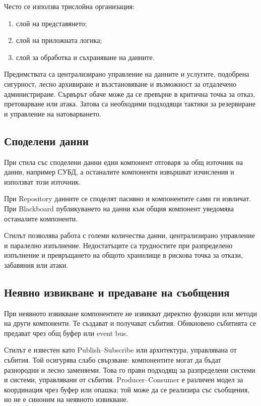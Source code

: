 Често се използва трислойна организация:

\begin{enumerate}
    \item слой на представянето;
    \item слой на приложната логика;
    \item слой за обработка и съхраняване на данните.
\end{enumerate}

Предимствата са централизирано управление на данните и услугите, подобрена сигурност, лесно архивиране и възстановяване и възможност за отдалечено администриране. Сървърът обаче може да се превърне в критична точка за отказ, претоварване или атака. Затова са необходими подходящи тактики за резервиране и управление на натоварването.

\subsection{Споделени данни}\label{s:27.4.5}

\begin{defn}
При стила със споделени данни един компонент отговаря за общ източник на данни, например СУБД, а останалите компоненти извършват изчисления и използват този източник.
\end{defn}

При Repository данните се споделят пасивно и компонентите сами ги извличат. При Blackboard публикуването на данни към общия компонент уведомява останалите компоненти.

Стилът позволява работа с големи количества данни, централизирано управление и паралелно изпълнение. Недостатъците са трудностите при разпределено изпълнение и превръщането на общото хранилище в рискова точка за откази, забавяния или атаки.

\subsection{Неявно извикване и предаване на съобщения}\label{s:27.4.6}

\begin{defn}
При неявното извикване компонентите не извикват директно функции или методи на други компоненти. Те създават и получават събития. Обикновено събитията се предават чрез общ буфер или event bus.
\end{defn}

Стилът е известен като Publish--Subscribe или архитектура, управлявана от събития. Той осигурява слабо свързване: компонентите могат да бъдат разнородни и лесно заменяеми. Това го прави подходящ за разпределени системи и системи, управлявани от събития. Producer--Consumer е различен модел за координация чрез буфер или опашка; той може да се реализира със съобщения, но не е синоним на неявното извикване.

